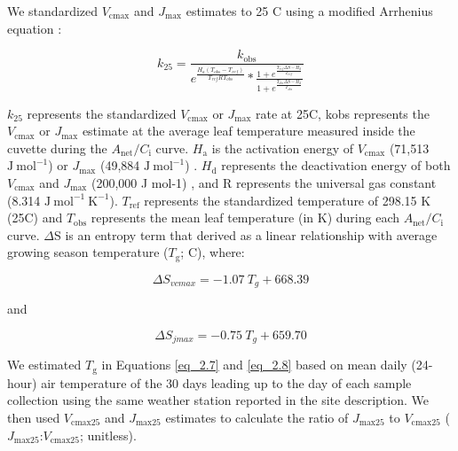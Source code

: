 We standardized $V_\mathrm{cmax}$ and $J_\mathrm{max}$ estimates to 25 \textdegree{}C using a modified Arrhenius equation :

\begin{equation} \label{eq_2.6}
    k_\mathrm{25}=\frac{k_\mathrm{obs}}{e^{\frac{H_a(T_{obs}-T_{ref})}{T_{ref}RT_{obs}}}*\frac{1+e^{\frac{T_{ref}\Delta S-H_d}{T_{ref}}}}{1+e^{\frac{T_{obs}\Delta S-H_d}{T_{obs}}}}}
\end{equation}

$k_\mathrm{25}$ represents the standardized $V_\mathrm{cmax}$ or $J_\mathrm{max}$ rate at 25\textdegree{}C, kobs represents the $V_\mathrm{cmax}$ or $J_\mathrm{max}$ estimate at the average leaf temperature measured inside the cuvette during the $A_\mathrm{net}/C_\mathrm{i}$ curve. $H_\mathrm{a}$ is the activation energy of $V_{\mathrm{cmax}}$ (71,513 $\mathrm{J\ mol^{-1}}$)  or $J_\mathrm{max}$ (49,884 $\mathrm{J\ mol^{-1}}$) . $H_\mathrm{d}$ represents the deactivation energy of both $V_\mathrm{cmax}$ and $J_\mathrm{max}$ (200,000 J mol-1) , and R represents the universal gas constant (8.314 $\mathrm{J\ mol^{-1}\ K^{-1}}$). $T_\mathrm{ref}$ represents the standardized temperature of 298.15 K (25\textdegree{}C) and $T_\mathrm{obs}$ represents the mean leaf temperature (in K) during each $A_\mathrm{net}/C_\mathrm{i}$ curve. $\Delta$S is an entropy term that  derived as a linear relationship with average growing season temperature ($T_\mathrm{g}$; \textdegree{}C), where: 

\begin{equation} \label{eq_2.7}
    \Delta S_{vcmax}=-1.07\ T_{g}+668.39
\end{equation}
    
\noindent and
   
\begin{equation} \label{eq_2.8}
    \Delta S_{jmax}=-0.75\ T_{g}+659.70
\end{equation}

\noindent We estimated $T_\mathrm{g}$ in Equations \ref{eq_2.7} and \ref{eq_2.8} based on mean daily (24-hour) air temperature of the 30 days leading up to the day of each sample collection using the same weather station reported in the site description. We then used $V_\mathrm{cmax25}$ and $J_\mathrm{max25}$ estimates to calculate the ratio of $J_\mathrm{max25}$ to $V_\mathrm{cmax25}$ ($J_\mathrm{max25}$:$V_\mathrm{cmax25}$; unitless).

